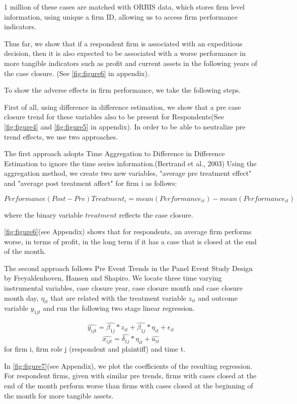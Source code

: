 \documentclass[12pt]{article}
\begin{document}
1 million of these cases are matched with ORBIS data, which stores firm level information, using unique a firm ID, allowing us to access firm performance indicators.

Thus far, we show that if a respondent firm is associated with an expeditious decision, then it is also expected to be associated with a worse performance in more tangible indicators such as profit and current assets in the following years of the case closure. (See \ref{fig:figure6} in appendix). 

To show the adverse effects in firm performance, we take the following steps.

First of all, using difference in difference estimation, we show that a pre case closure trend for these variables also to be present for Respondents(See \ref{fig:figure4} and \ref{fig:figure5} in appendix). In order to be able to neutralize pre trend effects, we use two approaches. 

The first approach adopts Time Aggregation to Difference in Difference Estimation to ignore the time series information.(Bertrand et al., 2003) Using the aggregation method, we create two new variables, "average pre treatment effect" and "average post treatment affect" for firm i as follows: 

$$ Performance(Post - Pre)Treatment_i = mean(Performance_{it}) - mean(Performance_{it})$$

where the binary variable $treatment$ reflects the case closure. 

\ref{fig:figure6}(see Appendix) shows that for respondents, an average firm performs worse, in terms of profit, in the long term if it has a case that is closed at the end of the month. 

The second approach follows Pre Event Trends in the Panel Event Study Design by Freyaldenhoven, Hansen and Shapiro. We locate three time varying instrumental variables, case closure year, case closure month and case closure month day, $\eta_{it}$ that are related with the treatment variable $z_{it}$ and outcome variable $y_{1jt}$ and run the following two stage linear regression.

$$\hat{y_{ijt}} = \hat{\beta_{1j}}*z_{it} + \hat{\beta_{1j}}*\eta_{it} + \epsilon_{it} $$
$$\hat{x_{ijt}} = \hat{\delta_{1j}}*\eta_{it} + \hat{u_{it}} $$
for firm i, firm role j (respondent and plaintiff) and time t. 

In \ref{fig:figure7}(see Appendix), we plot the coefficients of the resulting regression. For respondent firms, given with similar pre trends, firms with cases closed at the end of the month perform worse than firms with cases closed at the beginning of the month for more tangible assets. 
\end{document}
